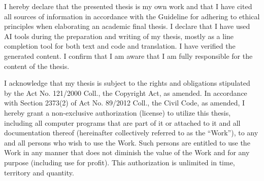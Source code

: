 \documentclass[english,bachelor,unicode,oneside,bw]{ctufit-thesis}
\begin{document}
\begin{declarationpage}
	I hereby declare that the presented thesis is my own work and that I have cited all sources of
	information in accordance with the Guideline for adhering to ethical principles when elaborating an
	academic final thesis.
	I declare that I have used AI tools during the preparation and writing of my thesis,
	mostly as a line completion tool for both text and code and translation.
	I have verified the generated content.
	I confirm that I am aware that I am fully responsible for the content of the thesis.

	I acknowledge that my thesis is subject to the rights and obligations stipulated by the Act No.
	121/2000 Coll., the Copyright Act, as amended. In accordance with Section 2373(2) of Act No.
	89/2012 Coll., the Civil Code, as amended, I hereby grant a non-exclusive authorization (license) to
	utilize this thesis, including all computer programs that are part of it or attached to it and all
	documentation thereof (hereinafter collectively referred to as the ``Work''), to any and all persons
	who wish to use the Work. Such persons are entitled to use the Work in any manner that does not
	diminish the value of the Work and for any purpose (including use for profit). This authorization is
	unlimited in time, territory and quantity.
\end{declarationpage}

\printabstractpage{} %

% 
% 
% 
% 
% 
% 
% 
% 
% 
\end{document}
